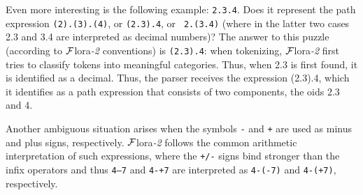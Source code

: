 \documentclass[11pt]{article}
\newcommand{\FLORA}{{\mbox{\sc ${\cal F}${lora}\rm\emph{-2}}}\xspace}
\begin{document}
Even more interesting is the following example: {\tt 2.3.4}. Does it
represent the path expression {\tt (2).(3).(4)}, or {\tt (2.3).4}, or {\tt
  2.(3.4)} (where in the latter two cases 2.3 and 3.4 are interpreted as
decimal numbers)? The answer to this puzzle (according to \FLORA conventions)
is {\tt (2.3).4}: when
tokenizing, \FLORA first tries to classify tokens into meaningful
categories. Thus, when 2.3 is first found, it is identified as a
decimal. Thus, the parser receives the expression (2.3).4, which it
identifies as a path expression that consists of two components, the oids
2.3 and 4.

Another ambiguous situation arises when the symbols {\tt -} and {\tt +} are
used as minus and plus
signs, respectively. \FLORA follows the common arithmetic interpretation of
such expressions, where the {\tt +/-} signs bind stronger than the infix
operators and thus
{\tt 4--7} and {\tt 4-+7} are interpreted as {\tt 4-(-7)} and {\tt 4-(+7)},
respectively.
\end{document}
